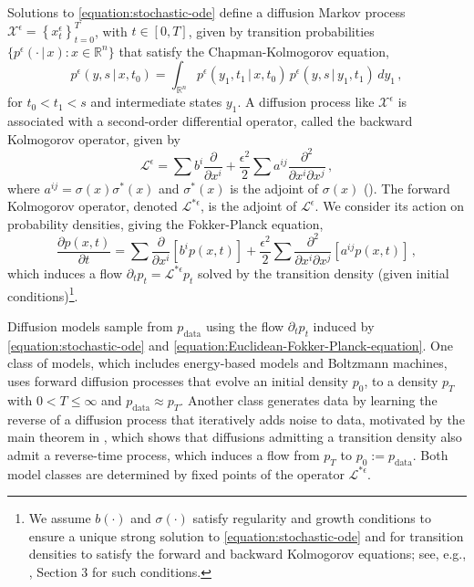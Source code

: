 \documentclass[12pt]{article}
\begin{document}
Solutions to \eqref{equation:stochastic-ode} define a diffusion Markov process $\mathcal{X}^{\epsilon}=\left\{x^{\epsilon}_t \right\}^T_{t=0}$, with $t \in [0,T]$, given by transition probabilities $\{p^{\epsilon}(\cdot \, | \, x) : x\in \mathbb{R}^n\}$ that satisfy the Chapman-Kolmogorov equation,
\begin{equation*}
\label{equation:transition-probabilities-diffusion-markov}
    p^{\epsilon}(y, s  \, | \, x,t_0) = \int_{\mathbb{R}^n} p^{\epsilon}(y_1, t_1  \, | \, x,t_0) \, p^{\epsilon}(y, s \, | \, y_1,t_1 ) \, dy_{1} \, ,
\end{equation*}
for $t_0 < t_1 < s$ and intermediate states $y_1$. A diffusion process like $\mathcal{X}^{\epsilon}$ is associated with a second-order differential operator, called the backward Kolmogorov operator, given by
\begin{equation}
\label{equation:Euclidean-backward-Kolmogorov}
    \mathcal{L}^{\epsilon} = \sum b^i \frac{\partial}{\partial x^i} + \frac{\epsilon^2}{2}\sum a^{ij} \frac{\partial^2}{\partial x^i \partial x^j} \, ,
\end{equation}
where $a^{ij} = \sigma(x)\sigma^*(x)$ and $\sigma^*(x)$ is the adjoint of $\sigma (x)$ (\cite{ventsel1970small}). The forward Kolmogorov operator, denoted $\mathcal{L}^{*\epsilon}$, is the adjoint of $\mathcal{L}^{\epsilon}$. We consider its action on probability densities, giving the Fokker-Planck equation,
\begin{equation}
\label{equation:Euclidean-Fokker-Planck-equation}
    \frac{\partial p(x,t)}{\partial t} = \sum \frac{\partial}{\partial x^i}\left[b^i p(x,t)\right] + \frac{\epsilon^2}{2}\sum \frac{\partial^2}{\partial x^i \partial x^j}\left[a^{ij} p(x,t)\right] \, ,
\end{equation}
which induces a flow $\partial_t p_t = \mathcal{L}^{*\epsilon}p_t$ solved by the transition density (given initial conditions)\footnote{We assume $b(\cdot)$ and $\sigma(\cdot)$ satisfy regularity and growth conditions to ensure a unique strong solution to \eqref{equation:stochastic-ode} and for transition densities to satisfy the forward and backward Kolmogorov equations; see, e.g., \cite{anderson1982reverse}, Section 3 for such conditions.}. 

Diffusion models sample from $p_{\text{data}}$ using the flow $\partial_t p_t$ induced by \eqref{equation:stochastic-ode} and \eqref{equation:Euclidean-Fokker-Planck-equation}. One class of models, which includes energy-based models and Boltzmann machines, uses forward diffusion processes that evolve an initial density $p_0$, to a density $p_T$ with $0<T\leq\infty$ and $p_{\text{data}} \approx p_{T}$. Another class generates data by learning the reverse of a diffusion process that iteratively adds noise to data, motivated by the main theorem in \cite{anderson1982reverse}, which shows that diffusions admitting a transition density also admit a reverse-time process, which induces a flow from $p_T$ to $p_0 := p_{\text{data}}$. Both model classes are determined by fixed points of the operator $\mathcal{L}^{*\epsilon}$. 
\end{document}

